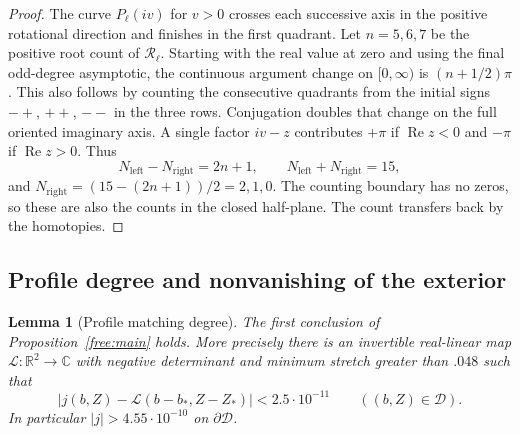 \documentclass[11pt]{article}
\numberwithin{equation}{section}
\newtheorem{lemma}[theorem]{Lemma}
\theoremstyle{definition}
\theoremstyle{remark}
\begin{document}
\begin{proof}
The curve $P_\ell(iv)$ for $v>0$ crosses each successive axis in the
positive rotational direction and finishes in the first quadrant.
Let $n=5,6,7$ be the positive root count of $\mathcal R_\ell$.
Starting with the real value at zero and using the final odd-degree
asymptotic, the continuous argument change on $[0,\infty)$ is
$(n+1/2)\pi$.  This also follows by counting the consecutive quadrants
from the initial signs $-+$, $++$, $--$ in the three rows.  Conjugation
doubles that change on the full oriented imaginary axis.  A single
factor $iv-z$ contributes $+\pi$ if $\operatorname{Re}z<0$ and
$-\pi$ if $\operatorname{Re}z>0$.  Thus
\[
 N_{\mathrm{left}}-N_{\mathrm{right}}=2n+1,
 \qquad N_{\mathrm{left}}+N_{\mathrm{right}}=15,
\]
and $N_{\mathrm{right}}=(15-(2n+1))/2=2,1,0$.
The counting boundary has no zeros, so these are also the counts in
the closed half-plane.  The count transfers back by the homotopies.
\end{proof}

\subsection{Profile degree and nonvanishing of the exterior}

\begin{lemma}[Profile matching degree]\label{free:profile-degree}
The first conclusion of Proposition~\ref{free:main} holds.  More
precisely there is an invertible real-linear map
$\mathcal L:\mathbb R^2\to\mathbb C$ with negative determinant and
minimum stretch greater than $.048$ such that
\begin{equation}\label{free:profile-linearization}
 |j(b,Z)-\mathcal L(b-b_*,Z-Z_*)|<2.5\cdot10^{-11}
 \qquad((b,Z)\in\mathcal D).
\end{equation}
In particular $|j|>4.55\cdot10^{-10}$ on $\partial\mathcal D$.
\end{lemma}
\end{document}
